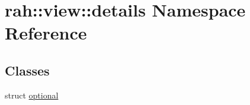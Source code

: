 \hypertarget{namespacerah_1_1view_1_1details}{}\section{rah\+::view\+::details Namespace Reference}
\label{namespacerah_1_1view_1_1details}
\subsection*{Classes}
\begin{DoxyCompactItemize}
\item 
struct \mbox{\hyperlink{structrah_1_1view_1_1details_1_1optional}{optional}}
\end{DoxyCompactItemize}
